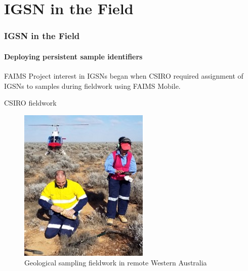 \section{IGSN in the Field}

\begin{sectionframe} %
	\frametitle{IGSN in the Field}
	\framesubtitle{Deploying persistent sample identifiers}

    \vfill
    
FAIMS Project interest in IGSNs began when CSIRO required assignment of IGSNs to samples during fieldwork using FAIMS Mobile.

\end{sectionframe}


\begin{frame}{CSIRO fieldwork}
 \begin{figure}[SF]
    \centering
    \vspace{-0.5cm}
        \includegraphics[height=.70\textheight]{figures/CSIRO-fieldwork.jpg}
        \caption{Geological sampling fieldwork in remote Western Australia}
        \label{fig:CSIRO geological sampling fieldwork}
 \end{figure}
\end{frame}



